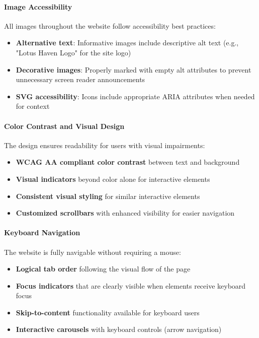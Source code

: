 \paragraph{Image Accessibility}
All images throughout the website follow accessibility best practices:

\begin{itemize}
    \item \textbf{Alternative text}: Informative images include descriptive alt text (e.g., "Lotus Haven Logo" for the site logo)
    \item \textbf{Decorative images}: Properly marked with empty alt attributes to prevent unnecessary screen reader announcements
    \item \textbf{SVG accessibility}: Icons include appropriate ARIA attributes when needed for context
\end{itemize}

\paragraph{Color Contrast and Visual Design}
The design ensures readability for users with visual impairments:

\begin{itemize}
    \item \textbf{WCAG AA compliant color contrast} between text and background
    \item \textbf{Visual indicators} beyond color alone for interactive elements
    \item \textbf{Consistent visual styling} for similar interactive elements
    \item \textbf{Customized scrollbars} with enhanced visibility for easier navigation
\end{itemize}

\paragraph{Keyboard Navigation}
The website is fully navigable without requiring a mouse:

\begin{itemize}
    \item \textbf{Logical tab order} following the visual flow of the page
    \item \textbf{Focus indicators} that are clearly visible when elements receive keyboard focus
    \item \textbf{Skip-to-content} functionality available for keyboard users
    \item \textbf{Interactive carousels} with keyboard controls (arrow navigation)
\end{itemize}

